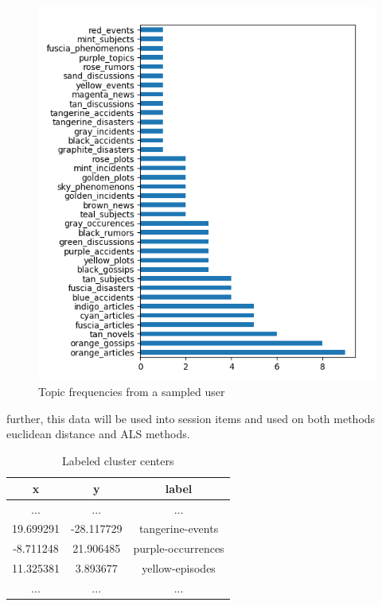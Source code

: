 \documentclass[ecp,tc,english]{iiufrgs}
\begin{document}
        \begin{figure}[!ht]
            \centering
            \includegraphics{images/frequencies.png}
            \caption{Topic frequencies from a sampled user}
            \label{fig:my_label}
        \end{figure}
        
    
        further, this data will be used into session items and used on both methods euclidean distance and ALS methods.
        
        \begin{table}[!ht]
            \centering
                \begin{tabular}{ |c|c|c| } 
                \hline
                x & y & label \\
                \hline 
                ... & ...  & ... \\
                19.699291 & -28.117729 & tangerine-events \\ 
                -8.711248 & 21.906485 & purple-occurrences \\ 
                11.325381 & 3.893677 & yellow-episodes \\ 
                ... & ...  & ...  \\
                \hline
                \end{tabular}
            \caption{Labeled cluster centers}
            \label{tab:my_label}
        \end{table}
\end{document}
